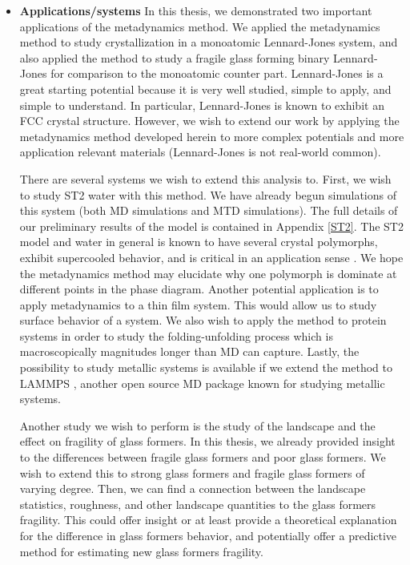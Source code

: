 \begin{itemize}
	\item \textbf{Applications/systems}  
	In this thesis, we demonstrated two important applications of the metadynamics method.  We applied the metadynamics method to study crystallization in a monoatomic Lennard-Jones system, and also applied the method to study a fragile glass forming binary Lennard-Jones for comparison to the monoatomic counter part.  Lennard-Jones is a great starting potential because it is very well studied, simple to apply, and simple to understand. In particular, Lennard-Jones is known to exhibit an FCC crystal structure.  However, we wish to extend our work by applying the metadynamics method developed herein to more complex potentials and more application relevant materials (Lennard-Jones is not real-world common).  
	
	There are several systems we wish to extend this analysis to.  First, we wish to study ST2 water with this method.  We have already begun simulations of this system (both MD simulations and MTD simulations).  The full details of our preliminary results of the model is contained in Appendix \ref{ST2}.  The ST2 model and water in general is known to have several crystal polymorphs, exhibit supercooled behavior, and is critical in an application sense \cite{Haji-Akbari2015}.  We hope the metadynamics method may elucidate why one polymorph is dominate at different points in the phase diagram.  Another potential application is to apply metadynamics to a thin film system.  This would allow us to study surface behavior of a system.  We also wish to apply the method to protein systems in order to study the folding-unfolding process which is macroscopically magnitudes longer than MD can capture.  Lastly, the possibility to study metallic systems is available if we extend the method to LAMMPS \cite{LAMMPS}, another open source MD package known for studying metallic systems.
	
	Another study we wish to perform is the study of the landscape and the effect on fragility of glass formers.  In this thesis, we already provided insight to the differences between fragile glass formers and poor glass formers.  We wish to extend this to strong glass formers and fragile glass formers of varying degree.  Then, we can find a connection between the landscape statistics, roughness, and other landscape quantities to the glass formers fragility.  This could offer insight or at least provide a theoretical explanation for the difference in glass formers behavior, and potentially offer a predictive method for estimating new glass formers fragility.
	

\end{itemize}
